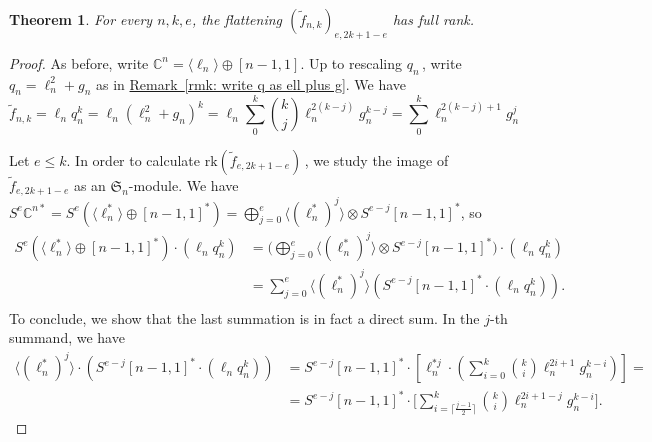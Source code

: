 \documentclass[11pt]{article}
\numberwithin{equation}{section}
\newtheorem{theorem}{Theorem}[section]
\theoremstyle{definition}
\theoremstyle{plain}
\newcommand{\expref}[2]{\hyperref[#2]{#1~\ref{#2}}}
\providecommand{\textsum}{}
\renewcommand{\textsum}{{\textstyle \sum}}
\providecommand{\textbinom}{}
\renewcommand{\textbinom}[2]{{\textstyle \binom{#1}{#2}}}
\newcommand{\bbC}{\mathbb{C}}
\newcommand{\frakS}{\mathfrak{S}}
\renewcommand{\tilde}[1]{\widetilde{#1}}
\newcommand{\rk}{\mathrm{rk}}
\begin{document}
\begin{theorem}\label{thm: flattenings of ellqk hit everything}
 For every $n,k,e$, the flattening $(\tilde f_{n,k})_{e,2k+1-e}$ has full rank.
\end{theorem}
\begin{proof}
 

As before, write $\bbC^n = \langle \ell_n \rangle \oplus [n-1,1]$. Up to rescaling $q_n$\,, write $q_n = \ell_n^2 + g_n$ as in \expref{Remark}{rmk: write q as ell plus g}. We have 
\[
 \tilde{f}_{n,k} = \ell_n q_n^k = \ell_n (\ell_n^2 + g_n)^k = \ell_n \textsum_0^k \textbinom{k}{j}\ell_n^{2(k-j)} g_n^{k-j} = \textsum_0^k \ell_n^{2(k-j)+1} g_n^{j} 
\]
 

Let $e \leq k$. In order to calculate $\rk (\tilde{f}_{e,2k+1-e})$\,, we study the image of $\tilde{f}_{e,2k+1-e}$ as an $\frakS_n$-module. We have $S^e \bbC^{n*} = S^e ( \langle \ell_n^* \rangle \oplus [n-1,1]^* )  =   \bigoplus_{j = 0}^e \langle (\ell_n^*)^j \rangle \otimes S^{e-j} [n-1,1]^* $, so   
\begin{equation}\label{eqn: decomposition of image of ellqk}
\begin{aligned}
 S^e ( \langle \ell_n^* \rangle \oplus [n-1,1]^* ) \cdot (\ell_n q_n^k) &= \biggl( \bigoplus_{j = 0}^e \langle (\ell_n^*)^j \rangle \otimes  S^{e-j} [n-1,1]^* \biggr) \cdot (\ell_n q_n^k)  \\
&= \sum_{j = 0}^e \langle (\ell_n^*)^j\rangle   (S^{e-j} [n-1,1]^* \cdot (\ell_n q_n^k)).  \\
%
\end{aligned}
\end{equation}
To conclude, we show that the last summation is in fact a direct sum. In the $j$-th summand, we have 
\begin{equation}\label{eqn: summation in thm ell q}
\begin{aligned}
\langle (\ell_n^*)^j\rangle   \cdot (S^{e-j} [n-1,1]^* \cdot (\ell_n q_n^k)) &=  S^{e-j} [n-1,1]^* \cdot \left[ \ell_n^{*j} \cdot  \left( \textsum_{i=0}^k \textbinom{k}{i} \ell_n^{2i+1} g_n^{k-i}\right)\right] =  \\ 
&= S^{e-j} [n-1,1]^* \cdot  \biggl[ \sum_{i=\lceil \frac{j-1}{2}\rceil}^k \textbinom{k}{i} \ell_n^{2i+1 - j} g_n^{k-i}\biggr].
\end{aligned}
\end{equation}


\end{proof}
\end{document}
